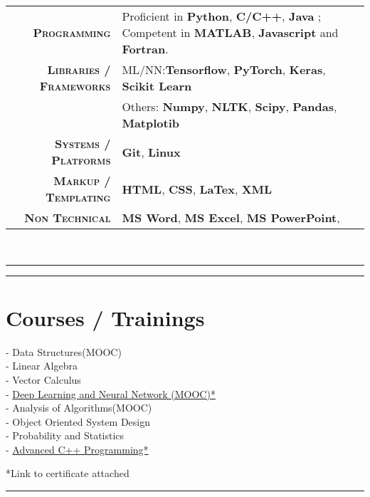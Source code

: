 \documentclass[]{Ankit-resume}
\begin{document}
\begin{tabular}{r|p{18cm}}
\textsc{\textbf{Programming}} & Proficient in \textbf{Python}, \textbf{C/C++}, \textbf{Java} ; Competent in \textbf{MATLAB}, \textbf{Javascript} and \textbf{Fortran}. \\
\textsc{\textbf{Libraries / Frameworks}} & ML/NN:\textbf{Tensorflow}, \textbf{PyTorch}, \textbf{Keras}, \textbf{Scikit Learn}\\
& Others: \textbf{Numpy}, \textbf{NLTK}, \textbf{Scipy}, \textbf{Pandas}, \textbf{Matplotib}\\
\textsc{\textbf{Systems / Platforms}} & \textbf{Git}, \textbf{Linux}\\
\textsc{\textbf{Markup / Templating}} & \textbf{HTML}, \textbf{CSS}, \textbf{LaTex}, \textbf{XML}\\
\textsc{\textbf{Non Technical}} & \textbf{MS Word}, \textbf{MS Excel}, \textbf{MS PowerPoint}, 
\end{tabular}\\
\vspace{\baselineskip}
\vspace{\baselineskip}
{\color{black}\hrule}
\sectionsep
\sectionsep
\sectionsep
{\color{black}\hrule}
\vspace{\baselineskip}
\section{Courses / Trainings}
\postsectionsep

\begin{multicols}{2}
 - Data Structures(MOOC)\\
 \vspace{1}
 - Linear Algebra \\
 \vspace{1}
 - Vector Calculus \\
 \vspace{1}
 - \href{https://www.coursera.org/account/accomplishments/records/A8FHGVY47LUX}{Deep Learning and Neural Network (MOOC)*} \\
 \vspace{1}
 - Analysis of Algorithms(MOOC) \\
 \vspace{1}
 - Object Oriented System Design \\
 \vspace{1}
 - Probability and Statistics \\
 \vspace{1}
 - \href{https://www.udemy.com/certificate/UC-d1bfc8b9-2b56-42be-b849-8510267013a1/}{Advanced C++ Programming*}
 \vspace{1}
 \end{multicols}
 {\hfill{ *Link to certificate attached}}
 \vspace{\baselineskip}
 {\color{black}\hrule}
\end{document}
